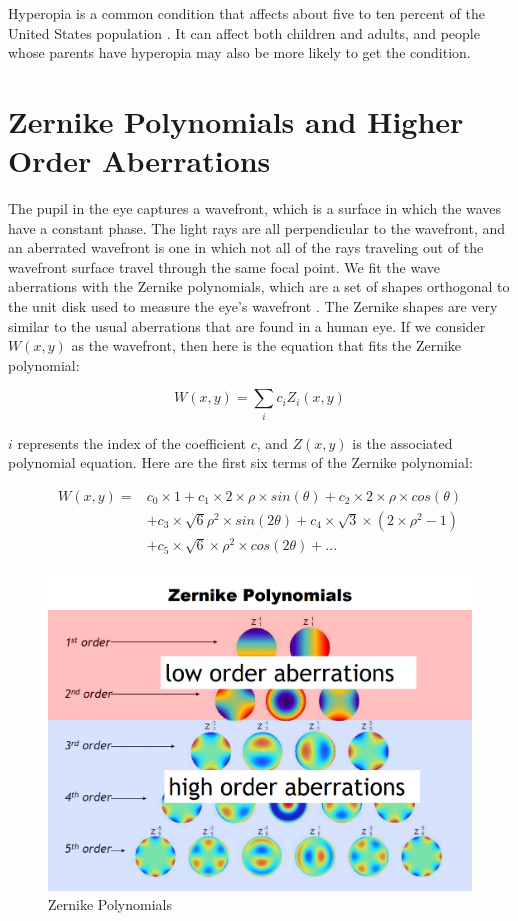 Hyperopia is a common condition that affects about five to ten percent of the United States population \cite{NEI}. It can affect both children and adults, and people whose parents have hyperopia may also be more likely to get the condition.


\section{Zernike Polynomials and Higher Order Aberrations}

The pupil in the eye captures a wavefront, which is a surface in which the waves have a constant phase. The light rays are all perpendicular to the wavefront, and an aberrated wavefront is one in which not all of the rays traveling out of the wavefront surface travel through the same focal point. We fit the wave aberrations with the Zernike polynomials, which are a set of shapes orthogonal to the unit disk used to measure the eye’s wavefront \cite{Weisstein:Zernike}. The Zernike shapes are very similar to the usual aberrations that are found in a human eye. If we consider $W(x,y)$ as the wavefront, then here is the equation that fits the Zernike polynomial:

$$W(x,y)= \sum_{i} c_i Z_i (x,y)$$

$i$ represents the index of the coefficient $c$, and $Z(x,y)$ is the associated polynomial equation. Here are the first six terms of the Zernike polynomial:

\begin{equation*}
\begin{aligned}
W(x,y) ={} & c_0 \times 1 + c_1 \times 2 \times \rho \times sin(\theta) + c_2 \times 2 \times \rho \times cos(\theta) \\
           & + c_3 \times \sqrt{6} \rho^2 \times sin(2\theta) + c_4 \times \sqrt{3} \times (2 \times \rho^2 - 1) \\
           & + c_5 \times \sqrt{6} \times \rho^2 \times cos(2\theta) + ...
\end{aligned}
\end{equation*}

\begin{figure}[ht!]
  \centering
  \includegraphics[width=5.0in]{chapters/chapter2/images/Zernike_polynomials.png}
  \caption{Zernike Polynomials \cite{Austin}}
  \label{fig:zernike}
\end{figure}

